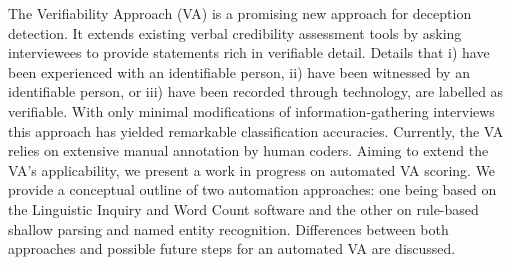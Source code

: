 The Verifiability Approach (VA) is a promising new approach for deception detection. It extends existing verbal credibility assessment tools by asking interviewees to provide statements rich in verifiable detail. Details that i) have been experienced with an identifiable person, ii) have been witnessed by an identifiable person, or iii) have been recorded through technology, are labelled as verifiable. With only minimal modifications of information-gathering interviews this approach has yielded remarkable classification accuracies. Currently, the VA relies on extensive manual annotation by human coders. Aiming to extend the VA's applicability, we present a work in progress on automated VA scoring. We provide a conceptual outline of two automation approaches: one being based on the Linguistic Inquiry and Word Count software and the other on rule-based shallow parsing and named entity recognition. Differences between both approaches and possible future steps for an automated VA are discussed.
